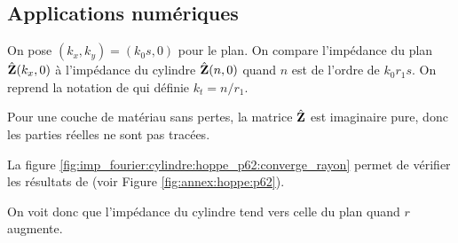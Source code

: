   \subsection{Applications numériques}

    On pose \((k_x,k_y) = (k_0 s, 0)\) pour le plan. On compare l'impédance du plan \(\hat{\mathbf{Z}}(k_x,0)\) à l'impédance du cylindre \(\hat{\mathbf{Z}}(n,0)\) quand \(n\) est de l'ordre de \(k_0r_1s\). On reprend la notation de \cite[p.~62]{hoppe_impedance_1995} qui définie \(k_t= n/r_1\).

    Pour une couche de matériau sans pertes, la matrice \(\hat{\mathbf{Z}}\) est imaginaire pure, donc les parties réelles ne sont pas tracées.

    La figure \ref{fig:imp_fourier:cylindre:hoppe_p62:converge_rayon} permet de vérifier les résultats de \cite[p.~62]{hoppe_impedance_1995} (voir Figure \ref{fig:annex:hoppe:p62}).

    On voit donc que l'impédance du cylindre tend vers celle du plan quand \(r\) augmente.



